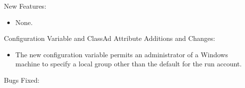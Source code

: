 \noindent New Features:

\begin{itemize}

\item None.

\end{itemize}

\noindent Configuration Variable and ClassAd Attribute Additions and Changes:

\begin{itemize}

\item The new configuration variable 
permits an administrator of a Windows machine to specify a local group other 
than the default  for the  run account.

\end{itemize}

\noindent Bugs Fixed:

